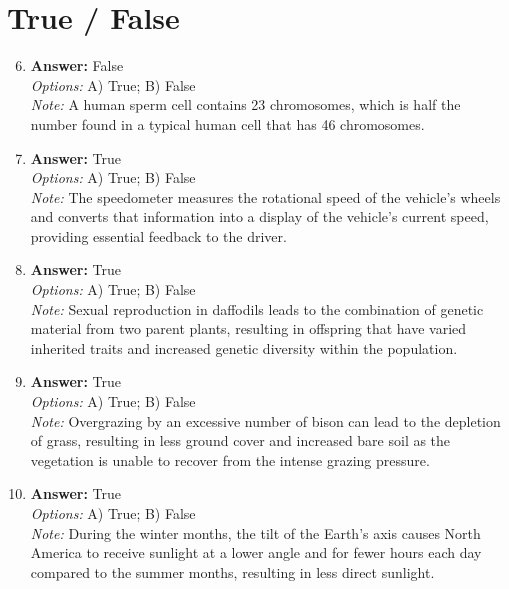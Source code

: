 \documentclass[12pt]{article}
\begin{document}
\section*{True / False}
\begin{enumerate}[label=\arabic*.]
\setcounter{enumi}{5}
\item \textbf{Answer:} False
\\ \textit{Options:} A) True; B) False
\\ \textit{Note:} A human sperm cell contains 23 chromosomes, which is half the number found in a typical human cell that has 46 chromosomes.
\item \textbf{Answer:} True
\\ \textit{Options:} A) True; B) False
\\ \textit{Note:} The speedometer measures the rotational speed of the vehicle's wheels and converts that information into a display of the vehicle's current speed, providing essential feedback to the driver.
\item \textbf{Answer:} True
\\ \textit{Options:} A) True; B) False
\\ \textit{Note:} Sexual reproduction in daffodils leads to the combination of genetic material from two parent plants, resulting in offspring that have varied inherited traits and increased genetic diversity within the population.
\item \textbf{Answer:} True
\\ \textit{Options:} A) True; B) False
\\ \textit{Note:} Overgrazing by an excessive number of bison can lead to the depletion of grass, resulting in less ground cover and increased bare soil as the vegetation is unable to recover from the intense grazing pressure.
\item \textbf{Answer:} True
\\ \textit{Options:} A) True; B) False
\\ \textit{Note:} During the winter months, the tilt of the Earth's axis causes North America to receive sunlight at a lower angle and for fewer hours each day compared to the summer months, resulting in less direct sunlight.
\end{enumerate}
\end{document}
